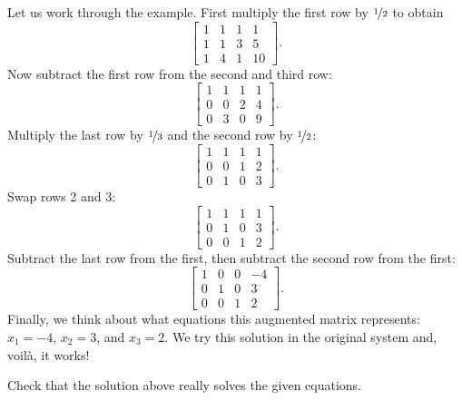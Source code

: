 Let us work through the example.  First multiply the first row by
$\nicefrac{1}{2}$ to obtain
\begin{equation*}
\left[
\begin{array}{ccc|c}
1 & 1 & 1 & 1 \\
1 & 1 & 3 & 5 \\
1 & 4 & 1 & 10
\end{array}
\right] .
\end{equation*}
Now subtract the first row from the second and third row:
\begin{equation*}
\left[
\begin{array}{ccc|c}
1 & 1 & 1 & 1 \\
0 & 0 & 2 & 4 \\
0 & 3 & 0 & 9
\end{array}
\right]
.
\end{equation*}
Multiply the last row by $\nicefrac{1}{3}$ and the second row by $\nicefrac{1}{2}$:
\begin{equation*}
\left[
\begin{array}{ccc|c}
1 & 1 & 1 & 1 \\
0 & 0 & 1 & 2 \\
0 & 1 & 0 & 3
\end{array}
\right]
.
\end{equation*}
Swap rows 2 and 3:
\begin{equation*}
\left[
\begin{array}{ccc|c}
1 & 1 & 1 & 1 \\
0 & 1 & 0 & 3 \\
0 & 0 & 1 & 2
\end{array}
\right]
.
\end{equation*}
Subtract the last row from the first, then subtract the second row
from the first:
\begin{equation*}
\left[
\begin{array}{ccc|c}
1 & 0 & 0 & -4 \\
0 & 1 & 0 & 3 \\
0 & 0 & 1 & 2
\end{array}
\right]
.
\end{equation*}
Finally, we think about what equations this augmented matrix represents:
$x_1 = -4$, $x_2 = 3$, and $x_3 = 2$.  We try this solution in the original
system and, voil\`a, it works!

\begin{exercise}
Check that the solution above really solves the given equations.
\end{exercise}

